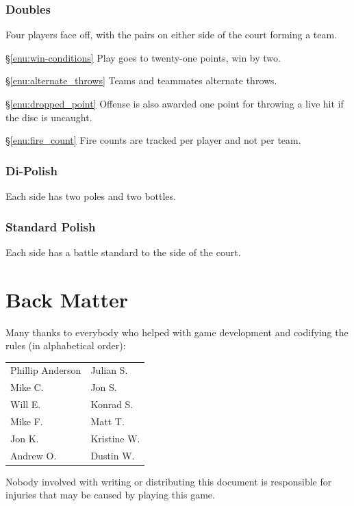 \documentclass[11pt,letterpaper,twocolumn,english,DIV=calc]{scrartcl}
\begin{document}
\section{Doubles}
Four players face off, with the pairs on either side of the court forming a team. 

\begin{description}
	\item{\S\ref{enu:win-conditions}} Play goes to twenty-one points, win by two.
	\item{\S\ref{enu:alternate_throws}} Teams and teammates alternate throws. 
	\item{\S\ref{enu:dropped_point}} Offense is also awarded one point for throwing a live hit if the disc is uncaught.
	\item{\S\ref{enu:fire_count}} Fire counts are tracked per player and not per team.
\end{description}

\section{Di-Polish}
Each side has two poles and two bottles.

\section{Standard Polish}
Each side has a battle standard to the side of the court.

\newpage{}

\part*{Back Matter}


Many thanks to everybody who helped with game development and codifying the rules (in alphabetical order):\medskip{}

\begin{tabular}{>{\raggedright}p{3.5cm}>{\raggedright}p{2.5cm}}
	Phillip Anderson & Julian S.\tabularnewline
	Mike C. & Jon S.\tabularnewline
	Will E. & Konrad S.\tabularnewline
	Mike F. & Matt T.\tabularnewline
	Jon K. & Kristine W.\tabularnewline
	Andrew O. & Dustin W.\tabularnewline
\end{tabular}


Nobody involved with writing or distributing this document is responsible for injuries that may be caused by playing this game.
\end{document}
